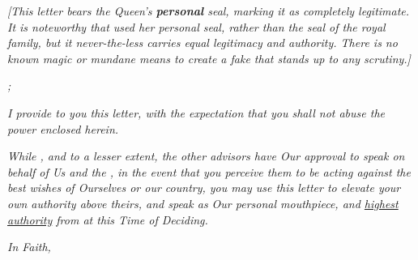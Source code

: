 \documentclass[white]{GL2020}
\begin{document}
\name{\wQueenLetter{}}

\emph{[This letter bears the Queen’s \textbf{personal} seal, marking it as completely legitimate. It is noteworthy that \cQueen{\full} used her personal seal, rather than the seal of the royal family, but it never-the-less carries equal legitimacy and authority. There is no known magic or mundane means to create a fake that stands up to any scrutiny.]}

\vspace{1cm}

\textsl{\cHistory{};}

\vspace{0.5cm}

\textsl{I provide to you this letter, with the expectation that you shall not abuse the power enclosed herein.}

\textsl{While \cEvil{}, and to a lesser extent, the other advisors have Our approval to speak on behalf of Us and the \pFarm{}, in the event that you perceive them to be acting against the best wishes of Ourselves or our country, you may use this letter to elevate your own authority above theirs, and speak as Our personal mouthpiece, and \underline{highest authority} from \pFarm{} at this Time of Deciding.}

\vspace{0.5cm}

\textsl{In Faith,}\\
\textsl{\cQueen{\full}}
\end{document}
